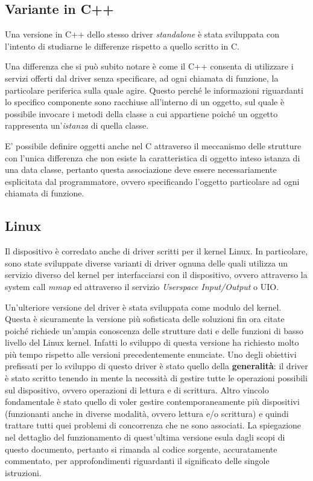 \documentclass[12pt,a4paper,twoside,openany]{book}
\begin{document}
\subsection*{Variante in C++}
Una versione in C++ dello stesso driver \textit{standalone} è stata sviluppata con l'intento di studiarne le differenze rispetto a quello scritto in C.
 
Una differenza che si può subito notare è come il C++ consenta di utilizzare i servizi offerti dal driver senza specificare, ad ogni chiamata di funzione,  la particolare periferica sulla quale agire. 
Questo perché le informazioni riguardanti lo specifico componente sono racchiuse all'interno di un oggetto, sul quale è possibile invocare i metodi della classe a cui appartiene poiché un oggetto rappresenta un'\textit{istanza} di quella classe.

E' possibile definire oggetti anche nel C attraverso il meccanismo delle strutture con l'unica differenza che non esiste la caratteristica di oggetto inteso istanza di una data classe, pertanto questa associazione deve essere necessariamente esplicitata dal programmatore, ovvero specificando l'oggetto particolare ad ogni chiamata di funzione. 

\subsection*{Linux}
Il dispositivo è corredato anche di driver scritti per il kernel Linux. In particolare, sono state sviluppate diverse varianti di driver ognuna delle quali utilizza un servizio diverso del kernel per interfacciarsi con il dispositivo, ovvero attraverso la system call \textit{mmap} ed attraverso  il servizio \textit{Userspace Input/Output} o UIO.

Un'ulteriore versione del driver è stata sviluppata come modulo del kernel. Questa è sicuramente la versione più sofisticata delle soluzioni fin ora citate poiché richiede un'ampia conoscenza delle strutture dati e delle funzioni di basso livello del Linux kernel. Infatti lo sviluppo di questa versione ha richiesto molto più tempo rispetto alle versioni precedentemente enunciate.
Uno degli obiettivi prefissati per lo sviluppo di questo driver è stato quello della \textbf{generalità}: il driver è stato scritto tenendo in mente la necessità di gestire tutte le operazioni possibili sul dispositivo, ovvero operazioni di lettura e di scrittura. 
Altro vincolo fondamentale è stato quello di voler gestire contemporaneamente più dispositivi (funzionanti anche in diverse modalità, ovvero lettura e/o scrittura) e quindi trattare tutti quei problemi di concorrenza che ne sono associati.
La spiegazione nel dettaglio del funzionamento di quest'ultima versione esula dagli scopi di questo documento, pertanto si rimanda al codice sorgente, accuratamente commentato, per approfondimenti riguardanti il significato delle singole istruzioni.
\clearpage
\end{document}
